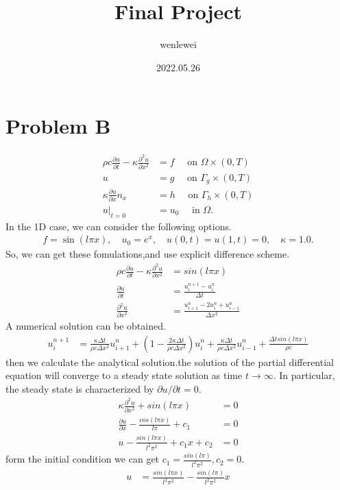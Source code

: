 \documentclass[a4paper]{article}
\title{Final Project}
\author{\songti wenlewei}
\date{2022.05.26}
\begin{document}
\maketitle
    \section{Problem B}
        \begin{align*}
            \rho c \frac{\partial u}{\partial t} - \kappa  \frac{\partial^2 u}{\partial x^2} &= f \quad \mbox{ on } \Omega \times (0,T) \\
            u &= g \quad \mbox{ on } \Gamma_{g} \times (0,T) \\
            \kappa \frac{\partial u}{\partial x} n_{x}  &= h \quad \mbox{ on } \Gamma_h \times (0,T) \\
            u|_{t=0} &= u_0 \quad \mbox{ in } \Omega.
        \end{align*}
        In the 1D case, we can consider the following options.
        \begin{align*}
            f = \sin(l \pi x), \quad u_0 = e^{x}, \quad u(0,t) = u(1,t) = 0, \quad \kappa = 1.0. 
        \end{align*}
        So, we can get these fomulations,and use explicit difference scheme.
        \begin{align*}
            \rho c \frac{\partial u}{\partial t} - \kappa  \frac{\partial^2 u}{\partial x^2} &= sin(l\pi x) \\
            \frac{\partial u}{\partial t} &= \frac{u^{n+1}_i - u^n_i}{\Delta t} \\
            \frac{\partial^2 u}{\partial x^2} &= \frac{u^n_{i+1}-2u^n_i+u^n_{i-1}}{\Delta x^2}
        \end{align*}
        A numerical solution can be obtained.
        \begin{align*}
            u^{n+1}_i &= \frac{\kappa \Delta t}{\rho c \Delta x^2} u^n_{i+1} + (1 - \frac{2\kappa \Delta t}{\rho c \Delta x^2})u^n_i + \frac{\kappa \Delta t}{\rho c \Delta x^2}u^n_{i-1} + \frac{\Delta t sin(l \pi x)}{\rho c}
        \end{align*}
        then we calculate the analytical solution.the solution of the partial differential equation will converge to a steady state solution as time $t \rightarrow \infty$. In particular, the steady state is characterized by $\partial u / \partial t = 0$. 
        \begin{align*}
            \kappa  \frac{\partial^2 u}{\partial x^2} + sin(l\pi x) &= 0 \\
            \frac{\partial u}{\partial x} - \frac{cos(l \pi x)}{l \pi} + c_1 &= 0 \\
            u - \frac{sin(l \pi x)}{l^2\pi^2} + c_1x + c_2 &= 0
        \end{align*}
        form the initial condition we can get $c_1 = \frac{sin(l \pi)}{l^2 \pi^2}, c_2 = 0 $.
        \begin{align*}
            u &= \frac{sin(l \pi x)}{l^2\pi^2} - \frac{sin(l \pi)}{l^2 \pi^2}x
        \end{align*}
\end{document}

